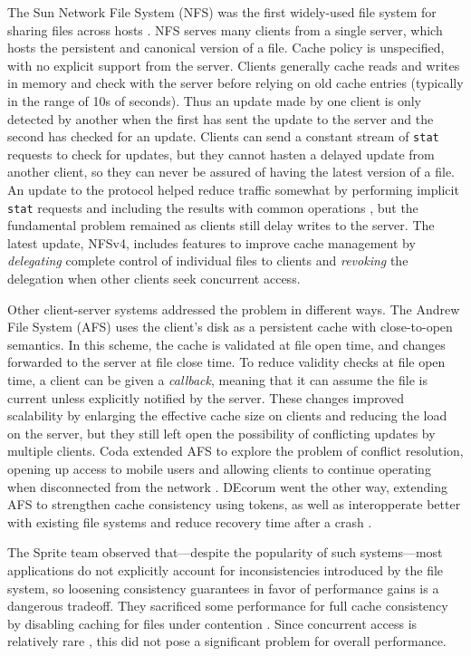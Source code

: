The Sun Network File System (NFS) was the first widely-used file system for sharing files across hosts \cite{sandberg}. NFS serves many clients from a single server, which hosts the persistent and canonical version of a file. Cache policy is unspecified, with no explicit support from the server. Clients generally cache reads and writes in memory and check with the server before relying on old cache entries (typically in the range of 10s of seconds). Thus an update made by one client is only detected by another when the first has sent the update to the server and the second has checked for an update. Clients can send a constant stream of \texttt{stat} requests to check for updates, but they cannot hasten a delayed update from another client, so they can never be assured of having the latest version of a file. An update to the protocol helped reduce traffic somewhat by performing implicit \texttt{stat} requests and including the results with common operations \cite{pawlowski,callaghan}, but the fundamental problem remained as clients still delay writes to the server. The latest update, NFSv4, includes features to improve cache management by \emph{delegating} complete control of individual files to clients and \emph{revoking} the delegation when other clients seek concurrent access.

Other client-server systems addressed the problem in different ways. The Andrew File System (AFS) \cite{satyanarayanan85,howard} uses the client's disk as a persistent cache with close-to-open semantics. In this scheme, the cache is validated at file open time, and changes forwarded to the server at file close time. To reduce validity checks at file open time, a client can be given a \emph{callback}, meaning that it can assume the file is current unless explicitly notified by the server. These changes improved scalability by enlarging the effective cache size on clients and reducing the load on the server, but they still left open the possibility of conflicting updates by multiple clients. Coda extended AFS to explore the problem of conflict resolution, opening up access to mobile users and allowing clients to continue operating when disconnected from the network \cite{satyanarayanan90,mummert}. DEcorum went the other way, extending AFS to strengthen cache consistency using tokens, as well as interopperate better with existing file systems and reduce recovery time after a crash \cite{kazar}.

The Sprite team observed that---despite the popularity of such systems---most applications do not explicitly account for inconsistencies introduced by the file system, so loosening consistency guarantees in favor of performance gains is a dangerous tradeoff. They sacrificed some performance for full cache consistency by disabling caching for files under contention \cite{baker91,nelson,welch}. Since concurrent access is relatively rare \cite{kistler}, this did not pose a significant problem for overall performance.

